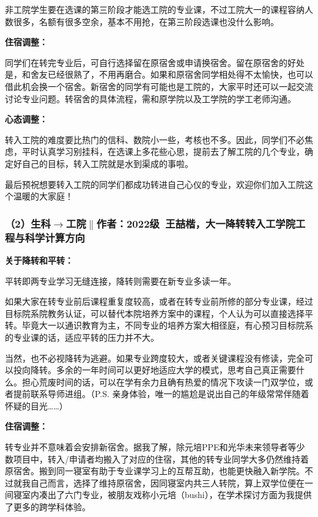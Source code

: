 \documentclass[11pt,oneside]{book}
\begin{document}
\vspace{10pt}

非工院学生要在选课的第三阶段才能选工院的专业课，不过工院大一的课程容纳人数很多，名额有很多空余，基本不用抢，在第三阶段选课也没什么影响。

\textbf{住宿调整：}

同学们在转完专业后，可自行选择留在原宿舍或申请换宿舍。留在原宿舍的好处是，和舍友已经很熟了，不用再磨合。如果和原宿舍同学相处得不太愉快，也可以借此机会换一个宿舍。新宿舍的同学有可能也是工院的，大家平时还可以一起交流讨论专业问题。转宿舍的具体流程，需和原学院以及工学院的学工老师沟通。

\textbf{心态调整：}

转入工院的难度要比热门的信科、数院小一些，考核也不多。因此，同学们不必焦虑，平时认真学习别挂科，在选课上多花些心思，提前去了解工院的几个专业，确定好自己的目标，转入工院就是水到渠成的事啦。

\vspace{10pt}

最后预祝想要转入工院的同学们都成功转进自己心仪的专业，欢迎你们加入工院这个温暖的大家庭！

\subsubsection{（2）生科$\to$工院$\parallel$作者：2022级\ 王喆楷，大一降转转入工学院工程与科学计算方向}
\textbf{\textbf{关于降转和平转}}\textbf{\textbf{：}}

平转即两专业学习无缝连接，降转则需要在新专业多读一年。

\vspace{10pt}

如果大家在转专业前后课程重复度较高，或者在转专业前所修的部分专业课，经过目标院系院教务认证，可以替代本院培养方案中的课程，个人认为可以直接选择平转。毕竟大一以通识教育为主，不同专业的培养方案大相径庭，有心预习目标院系的专业课的话，适应平转的压力并不大。

\vspace{10pt}

当然，也不必视降转为逃避。如果专业跨度较大，或者关键课程没有修读，完全可以投向降转。多余的一年时间可以更好地适应大学的模式，思考自己真正需要什么。担心荒废时间的话，可以在学有余力且确有热爱的情况下攻读一门双学位，或者提前联系导师进组。（P.S. 亲身体验，唯一的尴尬是说出自己的年级常常伴随着怀疑的目光……）

\textbf{住宿调整：}

转专业并不意味着会安排新宿舍。据我了解，除元培PPE和光华未来领导者等少数项目中，转入/申请者均搬入了对应的住宿，其他的转专业同学大多仍然维持着原宿舍。搬到同一寝室有助于专业课学习上的互帮互助，也能更快融入新学院。不过就我自己而言，选择了维持原宿舍，因同寝室内共三人转院，算上双学位便在一间寝室内凑出了六门专业，被朋友戏称小元培（bushi），在学术探讨方面为我提供了更多的跨学科体验。
\end{document}
